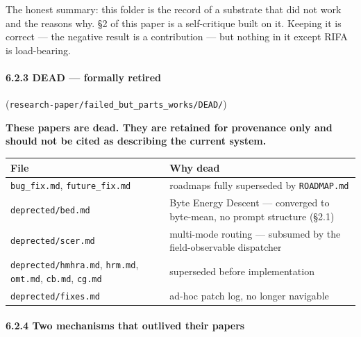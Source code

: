 \documentclass[
  11pt,
  a4paper,
]{article}
\begin{document}
The honest summary: this folder is the record of a substrate that did
not work and the reasons why. §2 of this paper is a self-critique built
on it. Keeping it is correct --- the negative result is a contribution
--- but nothing in it except RIFA is load-bearing.

\paragraph{6.2.3 DEAD --- formally retired}\label{dead-formally-retired}

(\texttt{research-paper/failed\_but\_parts\_works/DEAD/})

\textbf{These papers are dead. They are retained for provenance only and
should not be cited as describing the current system.}

\begin{longtable}[]{@{}
  >{\raggedright\arraybackslash}p{}
  >{\raggedright\arraybackslash}p{}@{}}
\toprule\noalign{}
\begin{minipage}[b]{\linewidth}\raggedright
File
\end{minipage} & \begin{minipage}[b]{\linewidth}\raggedright
Why dead
\end{minipage} \\
\midrule\noalign{}
\endhead
\bottomrule\noalign{}
\endlastfoot
\texttt{bug\_fix.md}, \texttt{future\_fix.md} & roadmaps fully
superseded by \texttt{ROADMAP.md} \\
\texttt{deprected/bed.md} & Byte Energy Descent --- converged to
byte-mean, no prompt structure (§2.1) \\
\texttt{deprected/scer.md} & multi-mode routing --- subsumed by the
field-observable dispatcher \\
\texttt{deprected/hmhra.md}, \texttt{hrm.md}, \texttt{omt.md},
\texttt{cb.md}, \texttt{cg.md} & superseded before implementation \\
\texttt{deprected/fixes.md} & ad-hoc patch log, no longer navigable \\
\end{longtable}

\paragraph{6.2.4 Two mechanisms that outlived their
papers}\label{two-mechanisms-that-outlived-their-papers}
\end{document}
